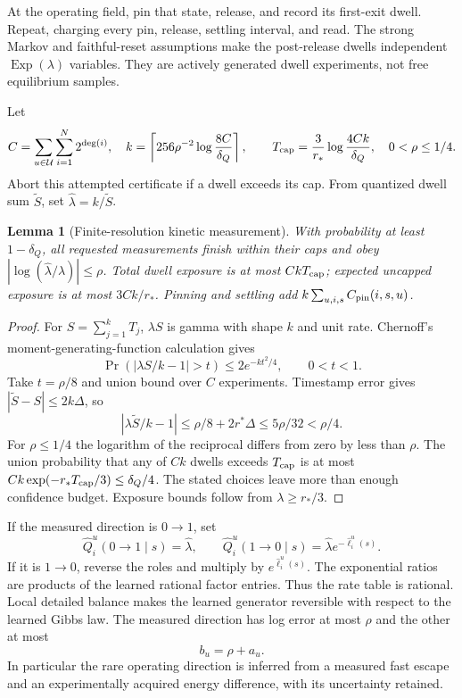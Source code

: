 \documentclass[11pt]{article}
\newtheorem{lemma}[theorem]{Lemma}
\newcommand{\calU}{\mathcal U}
\begin{document}
At the operating field, pin that state, release, and record its first-exit dwell. Repeat, charging every pin, release, settling interval, and read. The strong Markov and faithful-reset assumptions make the post-release dwells independent $\operatorname{Exp}(\lambda)$ variables. They are actively generated dwell experiments, not free equilibrium samples.

Let
\[
 C=\sum_{u\in\calU}\sum_{i=1}^N2^{\deg(i)},\quad
 k=\left\lceil256\rho^{-2}\log\frac{8C}{\delta_Q}\right\rceil,\qquad
 T_{\rm cap}=\frac3{r_*}\log\frac{4Ck}{\delta_Q},\quad 0<\rho\le1/4.
\]
Abort this attempted certificate if a dwell exceeds its cap. From quantized dwell sum $\widetilde S$, set $\widehat\lambda=k/\widetilde S$.

\begin{lemma}[Finite-resolution kinetic measurement]
With probability at least $1-\delta_Q$, all requested measurements finish within their caps and obey $|\log(\widehat\lambda/\lambda)|\le\rho$. Total dwell exposure is at most $CkT_{\rm cap}$; expected uncapped exposure is at most $3Ck/r_*$. Pinning and settling add $k\sum_{u,i,s}C_{\rm pin}(i,s,u)$.
\end{lemma}
\begin{proof}
For $S=\sum_{j=1}^kT_j$, $\lambda S$ is gamma with shape $k$ and unit rate. Chernoff's moment-generating-function calculation gives
\[
 \Pr(|\lambda S/k-1|>t)\le2e^{-kt^2/4},\qquad0<t<1.
\]
Take $t=\rho/8$ and union bound over $C$ experiments. Timestamp error gives $|\widetilde S-S|\le2k\Delta$, so
\[
 |\lambda\widetilde S/k-1|\le\rho/8+2r^*\Delta\le5\rho/32<\rho/4.
\]
For $\rho\le1/4$ the logarithm of the reciprocal differs from zero by less than $\rho$. The union probability that any of $Ck$ dwells exceeds $T_{\rm cap}$ is at most $Ck\exp(-r_*T_{\rm cap}/3)\le\delta_Q/4$. The stated choices leave more than enough confidence budget. Exposure bounds follow from $\lambda\ge r_*/3$.
\end{proof}

If the measured direction is $0\to1$, set
\[
 \widehat Q_i^u(0\to1\mid s)=\widehat\lambda,
 \qquad \widehat Q_i^u(1\to0\mid s)=\widehat\lambda e^{-\widehat\ell_i^u(s)}.
\]
If it is $1\to0$, reverse the roles and multiply by $e^{\widehat\ell_i^u(s)}$. The exponential ratios are products of the learned rational factor entries. Thus the rate table is rational. Local detailed balance makes the learned generator reversible with respect to the learned Gibbs law. The measured direction has log error at most $\rho$ and the other at most
\begin{equation}
 b_u=\rho+a_u.
 \label{eq:rate-error}
\end{equation}
In particular the rare operating direction is inferred from a measured fast escape and an experimentally acquired energy difference, with its uncertainty retained.
\end{document}
